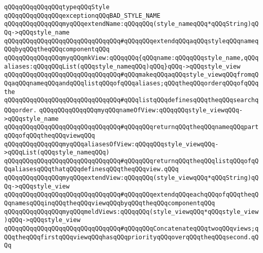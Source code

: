 \newline
\newline
\verb|qQQqqQQqqQQqqQQqtypeqQQqStyle|\newline
\newline
\verb|qQQqqQQqqQQqqQQqexceptionqQQqBAD_STYLE_NAME|\newline
\newline
\verb|qQQqqQQqqQQqqQQqmyqQQqextendName:qQQqqQQq(style_nameqQQq*qQQqString)qQQq->qQQqstyle_name|\newline
\verb|qQQqqQQqqQQqqQQqqQQqqQQqqQQqqQQq#qQQqqQQqextendqQQqaqQQqstyleqQQqnameqQQqbyqQQqtheqQQqcomponentqQQq|\newline
\newline
\verb|qQQqqQQqqQQqqQQqmyqQQqmkView:qQQqqQQq{qQQqname:qQQqqQQqstyle_name,qQQqaliases:qQQqqQQqList(qQQqstyle_nameqQQq)qQQq}qQQq->qQQqstyle_view|\newline
\verb|qQQqqQQqqQQqqQQqqQQqqQQqqQQqqQQq#qQQqmakeqQQqaqQQqstyle_viewqQQqfromqQQqaqQQqnameqQQqandqQQqlistqQQqofqQQqaliases;qQQqtheqQQqorderqQQqofqQQqthe|\newline
\verb|qQQqqQQqqQQqqQQqqQQqqQQqqQQqqQQq#qQQqlistqQQqdefinesqQQqtheqQQqsearchqQQqorder.|\newline
\newline
\newline
\verb|qQQqqQQqqQQqqQQqmyqQQqnameOfView:qQQqqQQqstyle_viewqQQq->qQQqstyle_name|\newline
\verb|qQQqqQQqqQQqqQQqqQQqqQQqqQQqqQQq#qQQqqQQqreturnqQQqtheqQQqnameqQQqpartqQQqofqQQqtheqQQqviewqQQq|\newline
\newline
\verb|qQQqqQQqqQQqqQQqmyqQQqaliasesOfView:qQQqqQQqstyle_viewqQQq->qQQqList(qQQqstyle_nameqQQq)|\newline
\verb|qQQqqQQqqQQqqQQqqQQqqQQqqQQqqQQq#qQQqqQQqreturnqQQqtheqQQqlistqQQqofqQQqaliasesqQQqthatqQQqdefinesqQQqtheqQQqview.qQQq|\newline
\newline
\verb|qQQqqQQqqQQqqQQqmyqQQqextendView:qQQqqQQq(style_viewqQQq*qQQqString)qQQq->qQQqstyle_view|\newline
\verb|qQQqqQQqqQQqqQQqqQQqqQQqqQQqqQQq#qQQqqQQqextendqQQqeachqQQqofqQQqtheqQQqnamesqQQqinqQQqtheqQQqviewqQQqbyqQQqtheqQQqcomponentqQQq|\newline
\newline
\verb|qQQqqQQqqQQqqQQqmyqQQqmeldViews:qQQqqQQq(style_viewqQQq*qQQqstyle_view)qQQq->qQQqstyle_view|\newline
\verb|qQQqqQQqqQQqqQQqqQQqqQQqqQQqqQQq#qQQqqQQqConcatenateqQQqtwoqQQqviews;qQQqtheqQQqfirstqQQqviewqQQqhasqQQqpriorityqQQqoverqQQqtheqQQqsecond.qQQq|\newline

